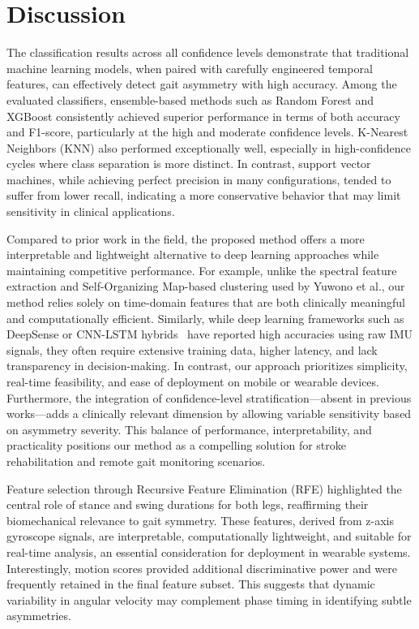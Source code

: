 \section{Discussion}
\label{sec:discussion}
The classification results across all confidence levels demonstrate that traditional machine learning models, when paired with carefully engineered temporal features, 
can effectively detect gait asymmetry with high accuracy. Among the evaluated classifiers, ensemble-based methods such as Random Forest and XGBoost consistently achieved 
superior performance in terms of both accuracy and F1-score, particularly at the high and moderate confidence levels. K-Nearest Neighbors (KNN) also performed 
exceptionally well, especially in high-confidence cycles where class separation is more distinct. In contrast, support vector machines, while achieving perfect 
precision in many configurations, tended to suffer from lower recall, indicating a more conservative behavior that may limit sensitivity in clinical applications.

Compared to prior work in the field, the proposed method offers a more interpretable and lightweight alternative to deep learning approaches while maintaining 
competitive performance. For example, unlike the spectral feature extraction and Self-Organizing Map-based clustering used by Yuwono et al.\cite{ref10}, 
our method relies solely on time-domain features that are both clinically meaningful and computationally efficient. Similarly, while deep learning frameworks 
such as DeepSense\cite{ref12} or CNN-LSTM hybrids~\cite{ref13} have reported high accuracies using raw IMU signals, they often require extensive training data, 
higher latency, and lack transparency in decision-making. In contrast, our approach prioritizes simplicity, real-time feasibility, and ease of deployment on 
mobile or wearable devices. Furthermore, the integration of confidence-level stratification—absent in previous works—adds a clinically relevant dimension by 
allowing variable sensitivity based on asymmetry severity. This balance of performance, interpretability, and practicality positions our method as a compelling 
solution for stroke rehabilitation and remote gait monitoring scenarios.

Feature selection through Recursive Feature Elimination (RFE) highlighted the central role of stance and swing durations for both legs, reaffirming their biomechanical 
relevance to gait symmetry. These features, derived from z-axis gyroscope signals, are interpretable, computationally lightweight, and suitable for real-time 
analysis, an essential consideration for deployment in wearable systems. Interestingly, motion scores provided additional discriminative power and were frequently 
retained in the final feature subset. This suggests that dynamic variability in angular velocity may complement phase timing in identifying subtle asymmetries.

